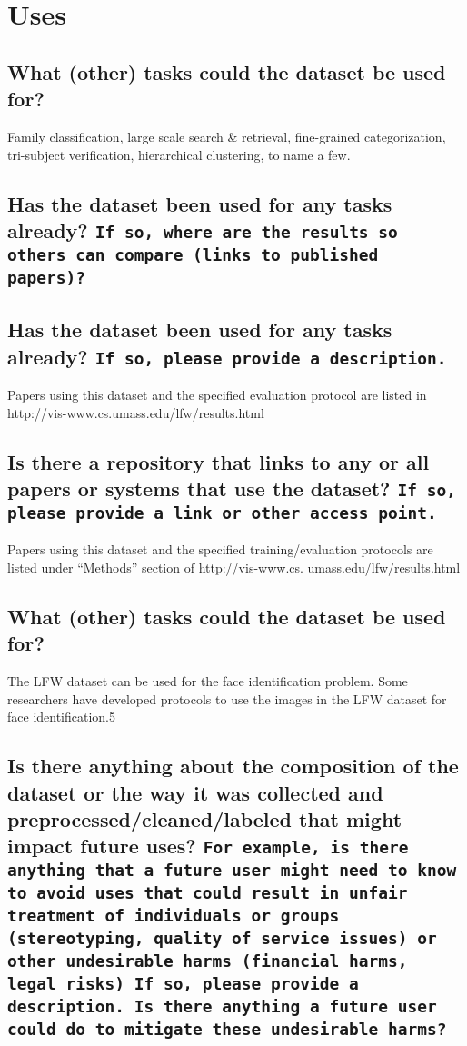 \section*{Uses}
\subsection*{What (other) tasks could the dataset be used for?}
\noindent Family classification, large scale search \& retrieval, fine-grained categorization, tri-subject verification, hierarchical clustering, to name a few.


\subsection*{Has the dataset been used for any tasks already? \texttt{If so, where are the results so others can compare (\eg links to published papers)?}}
\noindent 
\subsection*{Has the dataset been used for any tasks already? \texttt{If so, please provide a description.}}
Papers using this dataset and the specified evaluation protocol are
listed in http://vis-www.cs.umass.edu/lfw/results.html
\subsection*{Is there a repository that links to any or all papers or systems that use the dataset? \texttt{If so, please provide a link or other access point.}}
Papers using this dataset and the specified training/evaluation
protocols are listed under “Methods” section of http://vis-www.cs.
umass.edu/lfw/results.html
\subsection*{What (other) tasks could the dataset be used for?}
The LFW dataset can be used for the face identification problem.
Some researchers have developed protocols to use the images in
the LFW dataset for face identification.5
\subsection*{Is there anything about the composition of the dataset or the way it was collected and preprocessed/cleaned/labeled that might impact
future uses? \texttt{For example, is there anything that a future user might need to know to avoid uses that could result in unfair treatment of individuals or groups (\eg stereotyping, quality of service issues) or other undesirable harms (\eg financial harms, legal risks) If so, please provide a description. Is there anything a future user could do to mitigate these undesirable harms?}}

